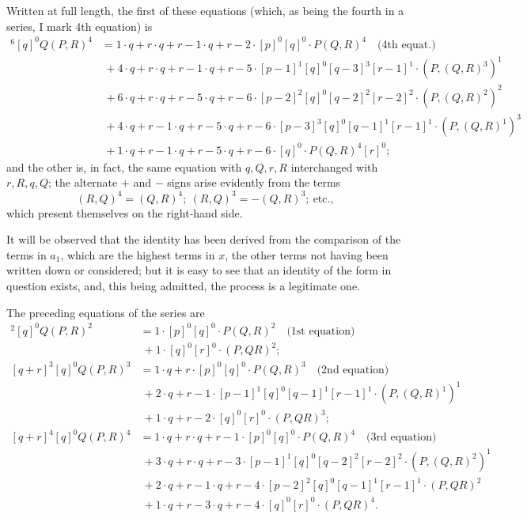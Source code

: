 \documentclass[11pt,a4paper]{article}
\begin{document}
Written at full length, the first of these equations (which, as being the fourth in a series, I mark 4th equation) is
\begin{align*}
[q+r]^{6}[q]^{0}Q(P, R)^{4} &= 1\cdot q+r\cdot q+r-1\cdot q+r-2\cdot [p]^{0}[q]^{0}\cdot P(Q, R)^{4} \quad\text{(4th equat.)}\\
&\ + 4\cdot q+r\cdot q+r-1\cdot q+r-5\cdot [p-1]^{1}[q]^{0}[q-3]^{3}[r-1]^{1}\cdot (P, (Q, R)^{3})^{1}\\
&\ + 6\cdot q+r\cdot q+r-5\cdot q+r-6\cdot [p-2]^{2}[q]^{0}[q-2]^{2}[r-2]^{2}\cdot (P, (Q, R)^{2})^{2}\\
&\ + 4\cdot q+r-1\cdot q+r-5\cdot q+r-6\cdot [p-3]^{3}[q]^{0}[q-1]^{1}[r-1]^{1}\cdot (P, (Q, R)^{1})^{3}\\
&\ + 1\cdot q+r-1\cdot q+r-5\cdot q+r-6\cdot [q]^{0}\cdot P(Q, R)^{4}[r]^{0};
\end{align*}
and the other is, in fact, the same equation with $q, Q, r, R$ interchanged with $r, R, q, Q$; the alternate $+$ and $-$ signs arise evidently from the terms
\[
(R, Q)^{4} = (Q, R)^{4};\ (R, Q)^{3} = -(Q, R)^{3};\ \text{etc.},
\]
which present themselves on the right-hand side.

\medskip

It will be observed that the identity has been derived from the comparison of the terms in $a_{1}$, which are the highest terms in $x$, the other terms not having been written down or considered; but it is easy to see that an identity of the form in question exists, and, this being admitted, the process is a legitimate one.

\medskip

The preceding equations of the series are
\begin{align*}
[q+r]^{2}[q]^{0}Q(P, R)^{2} &= 1\cdot [p]^{0}[q]^{0}\cdot P(Q, R)^{2}\quad\text{(1st equation)}\\
&\ + 1\cdot [q]^{0}[r]^{0}\cdot (P, QR)^{2};\\
[q+r]^{3}[q]^{0}Q(P, R)^{3} &= 1\cdot q+r\cdot [p]^{0}[q]^{0}\cdot P(Q, R)^{3}\quad\text{(2nd equation)}\\
&\ + 2\cdot q+r-1\cdot [p-1]^{1}[q]^{0}[q-1]^{1}[r-1]^{1}\cdot (P, (Q, R)^{1})^{1}\\
&\ + 1\cdot q+r-2\cdot [q]^{0}[r]^{0}\cdot (P, QR)^{3};\\
[q+r]^{4}[q]^{0}Q(P, R)^{4} &= 1\cdot q+r\cdot q+r-1\cdot [p]^{0}[q]^{0}\cdot P(Q, R)^{4}\quad\text{(3rd equation)}\\
&\ + 3\cdot q+r\cdot q+r-3\cdot [p-1]^{1}[q]^{0}[q-2]^{2}[r-2]^{2}\cdot (P, (Q, R)^{2})^{1}\\
&\ + 2\cdot q+r-1\cdot q+r-4\cdot [p-2]^{2}[q]^{0}[q-1]^{1}[r-1]^{1}\cdot (P, QR)^{2}\\
&\ + 1\cdot q+r-3\cdot q+r-4\cdot [q]^{0}[r]^{0}\cdot (P, QR)^{4}.
\end{align*}
\end{document}

